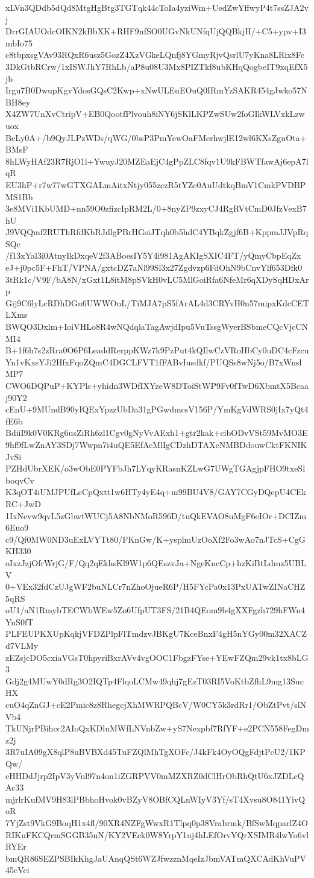 xLVn3QDdb5dQd8MtgHgBtg3TGTqk44cToIa4yziWm+UedZwYffwyP4t7ssZJA2vj
DrrGIAUOdcOIKN2kBbXK+RHF9nfSO0UGvNkUNfqUjQQBkjH/+C5+ypv+I3mbIo75
c8tbpxsgVAv93RQxR6usz5GozZ4XzVGkeLQnfj8YGmyRjvQsrlU7yKna8LRix8Fc
3DkGtbRCrw/1xISWJhY7RhLb/aP8u08U3Mx8PIZTkf8ubKHqQogbeIT9xqEfX5jb
Irgu7B0DwupKgvYdosGQsC2Kwp+xNwULEuEOuQ0IRmYzSAKR454gJwko57NBH8ey
X4ZW7UnXvCtripV+EB0QootfPlvouh8iNY6jSKlLKPZwSUw2foGIkWLVxkLzwuox
BeLy0A+/b9QyJLPzWDs/qWG/0bsP3PmYewOaFMerhwjlE12wl6KXsZguOta+BMsF
8hLWyHAf23R7RjO1l+YwuyJ20MZEaEjC4gPpZLC8fqv1U9kFBWTfawAj6epA7lqR
EU3hP+r7w77wGTXGALmAitxNtjy055zczR5tYZc0AuUdtkqBmV1CmkPVDBPMS1Bb
3e8MVi1KbUMD+nn59O0zfizcIpRM2L/0+8nyZP9zxyCJ4RgRVtCmD0JfzVexB7hU
J9VQQmf2RUThRfdKbRJdlgPBrHGsiJTqh0b5hdC4YBqkZgjf6B+KppmJJVpRqSQc
/f13xYal3i0AtnyIkDxqeV2f3ABoesIY5Y4i981AgAKIgSXIC4FT/yQmyCbpEqZx
eJ+j0pc5F+FhT/VPNA/gxtcDZ7aNl99Sl3x27Zgdvzp6FdOhN9bCnvYlf653Dfk0
3tRk1c/V9F/bA8N/xGxt1L8itM8pSVkH0vLC5MlGoiRfa6NfeMr6qXDySqHDxArp
Gij9C6lyLcRDhDGu6UWWOnL/TiMJA7pS5fArAL4d3CRYvH0n57mipxKdcCETLXms
BWQO3Dxlm+IoiVHLo8R4wNQdqlaTagAwjdIpu5VuTssgWyerBSbmeCQcVjcCNMI4
B+1f6h7s2zRra0O6P6LeaddRerppKWz7k9PzPut4kQIlwCzVRoHbCy0uDC4cFzcu
Yn1vKxsYJi2HfxFqoZQmC4DGCLFVT1fFABvIusdkf/PUQSs8wNj5o/B7xWnslMP7
CWO6DQPuP+KYPls+yhidn3WDfIXYzeW8DToiStWP9Fv0fTwD6XbmtX5Bcaaj90Y2
cEnU+9MUndB90yIQExYpzzUbDa31gPGwdmcsV156P/YmKgVdWRS0jIx7yQt4fE6b
BdiiI9k0V0KRg6usZiRh6zl1Cgv0gNyVvAExh1+gtr2kak+cibODvVSt59MvMO3E
9hf9fLwZnAY3SDj7Wwpn7i4uQE5EfAcMlIgCDzhDTAXcNMBDdouwCktFKNIKJvSi
PZHdUbrXEK/o3wObE0PYFbJh7LYqyKRasnKZLwG7UWgTGAgjpFHO9txeSlboqvCv
K3qOT4iUMJPUfLeCpQxtt1w6HTy4yE4q+m99BU4V8/GAY7CGyDQepU4CEkRC+JwD
1IxNevw9qvL5zGbwtWUCj5A8NbNMoR596D/tuQkEVAO8uMgF6eIOr+DCIZm6Euo9
c9/Qf0MW0ND3uExLVYTt80/FKnGw/K+ysplmUzOoXf2Fo3wAo7nJTcS+CgGKH330
oIxzJzjOfrWrjG/F/Qq2qEkhsKl9W1p6QEszvJa+NgeKncCp+hzKiBtLdmz5UBLV
0+VEx32fdCzUJgWF2buNLCr7nZhoOjueR6P/H5FYcPa0x13PxUATwZINaCHZ5qRS
oU1/aN1RmybTECWbWEw5Zo6UfpUT3FS/21B4QEom9b4gXXFgzh729hFWn4YnS0fT
PLFEUPKXUpKqkjVFDZPlpFlTmdzvJBKgU7KceBnxF4gH5nYGy00m32XACZd7VLMy
zEZsjcDO5cxiaVGsT0hpyriBxrAVv4vgOOC1FbgzFYse+YEwFZQm29vk1tx8bLG3
Gdj2g4MUwY0dRg3O2IQTp4FlqoLCMw49qhj7gEzT03RI5VoKtbZfhL9mg13SucHX
cuO4qZnGJ+cE2Pmic8z8RhegcjXhMWRPQBcV/W0CY5k3rdRr1/ObZtPvt/slNVb4
TkUNjrPBihcc2AIoQxKDluMWfLNVnbZw+yS7Nexpbf7RfYF+e2PCN558FegDmz2j
3R7uIA09gX8qlP8uBVBXd45TuFZQlMhTgXOFc/J4kFk4OyOQgFdjtPcU2/1KPQw/
cHHDdJjrp2IpV3yVul97n4on1iZGRPVV0mMZXRZ0dClHrObRhQtU6xJZDLcQAc33
mjrlrKufMV9H83lPBbhoHvok0vBZyV8OBfCQLnWIyV3Yf/sT4Xvsu8O841YivQoR
7YjZst9VkG9BoqH1x4fl/90XR4NZFgWwxR1Tlpq0p38Vrabrmk/BfSwMqparlZ4O
RIKuFKCQrmSGGB35nN/KY2VEck0W8YrpY1uj4hLEfOrvYQrXSIMR4lwYo6vlRYEr
bmQR86SEZPSBIkKhgJaUAnqQSt6WZJfwzznMqeIzJbmVATmQXCAdKhVuPV45cVci
